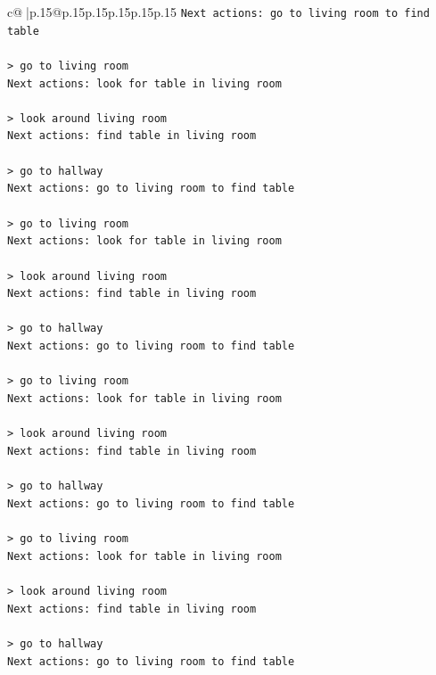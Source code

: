 \documentclass{article}
\begin{document}
{\begin{supertabular}{c@{$\;$}|p{.15\linewidth}@{}p{.15\linewidth}p{.15\linewidth}p{.15\linewidth}p{.15\linewidth}p{.15\linewidth}}
{{{\texttt{Next actions: go to living room to find table} \\
\\ 
\texttt{> go to living room} \\
\texttt{Next actions: look for table in living room} \\
\\ 
\texttt{> look around living room} \\
\texttt{Next actions: find table in living room} \\
\\ 
\texttt{> go to hallway} \\
\texttt{Next actions: go to living room to find table} \\
\\ 
\texttt{> go to living room} \\
\texttt{Next actions: look for table in living room} \\
\\ 
\texttt{> look around living room} \\
\texttt{Next actions: find table in living room} \\
\\ 
\texttt{> go to hallway} \\
\texttt{Next actions: go to living room to find table} \\
\\ 
\texttt{> go to living room} \\
\texttt{Next actions: look for table in living room} \\
\\ 
\texttt{> look around living room} \\
\texttt{Next actions: find table in living room} \\
\\ 
\texttt{> go to hallway} \\
\texttt{Next actions: go to living room to find table} \\
\\ 
\texttt{> go to living room} \\
\texttt{Next actions: look for table in living room} \\
\\ 
\texttt{> look around living room} \\
\texttt{Next actions: find table in living room} \\
\\ 
\texttt{> go to hallway} \\
\texttt{Next actions: go to living room to find table} \\
}}}
\end{supertabular}}
\end{document}

